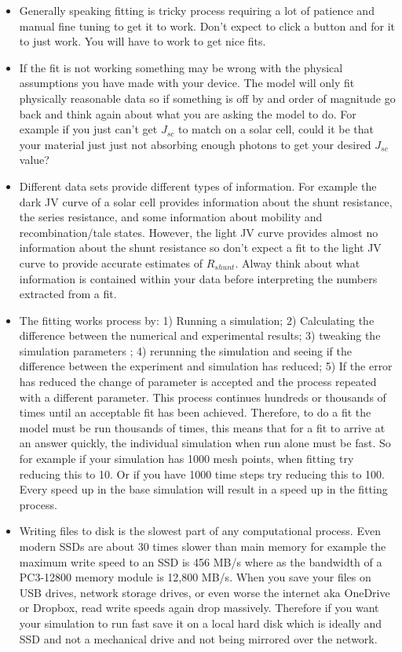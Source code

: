 \begin{itemize}
  \item Generally speaking fitting is tricky process requiring a lot of patience and manual fine tuning to get it to work. Don't expect to click a button and for it to just work. You will have to work to get nice fits.

  \item If the fit is not working something may be wrong with the physical assumptions you have made with your device. The model will only fit physically reasonable data so if something is off by and order of magnitude go back and think again about what you are asking the model to do. For example if you just can't get $J_{sc}$ to match on a solar cell, could it be that your material just just not absorbing enough photons to get your desired $J_{sc}$ value?

  \item Different data sets provide different types of information. For example the dark JV curve of a solar cell provides information about the shunt resistance, the series resistance, and some information about mobility and recombination/tale states. However, the light JV curve provides almost no information about the shunt resistance so don't expect a fit to the light JV curve to provide accurate estimates of $R_{shunt}$. Alway think about what information is contained within your data before interpreting the numbers extracted from a fit.

  \item The fitting works process by: 1) Running a simulation; 2) Calculating the difference between the numerical and experimental results; 3) tweaking the simulation parameters ; 4) rerunning the simulation and seeing if the difference between the experiment and simulation has reduced; 5) If the error has reduced the change of parameter is accepted and the process repeated with a different parameter.  This process continues hundreds or thousands of times until an acceptable fit has been achieved. Therefore, to do a fit the model must be run thousands of times, this means that for a fit to arrive at an answer quickly, the individual simulation when run alone must be fast. So for example if your simulation has 1000 mesh points, when fitting try reducing this to 10. Or if you have 1000 time steps try reducing this to 100. Every speed up in the base simulation will result in a speed up in the fitting process.

  \item Writing files to disk is the slowest part of any computational process. Even modern SSDs are about 30 times slower than main memory for example the maximum write speed to an SSD is 456 MB/s where as the bandwidth of a PC3-12800 memory module is  12,800 MB/s. When you save your files on USB drives, network storage drives, or even worse the internet aka OneDrive or Dropbox, read write speeds again drop massively. Therefore if you want your simulation to run fast save it on a local hard disk which is ideally and SSD and not a mechanical drive and not being mirrored over the network.


\end{itemize}
